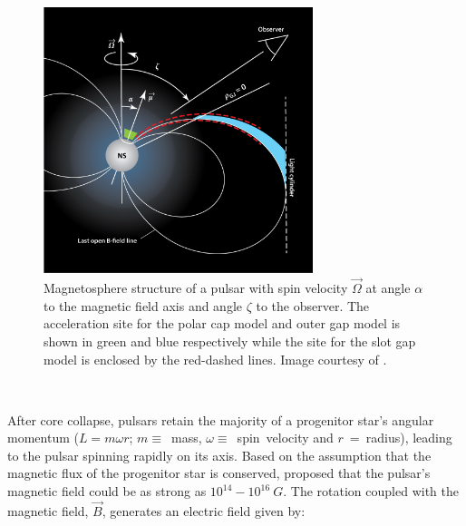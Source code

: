 \begin{figure}[ht]
	\centering
	\includegraphics[width=0.7\textwidth]{04_Introduction/Images/pulsar_wind_nebula/pulsar.jpeg}
	\caption{Magnetosphere structure of a pulsar with spin velocity $\vec{\Omega}$ at angle $\alpha$ to the magnetic field axis and angle $\zeta$ to the observer. The acceleration site for the polar cap model and outer gap model is shown in green and blue respectively while the site for the slot gap model is enclosed by the red-dashed lines. Image courtesy of \cite{2014ARA&A..52..211C}.}
	\label{fig:chapter1_magnetosphere_structure}
\end{figure}
\par~\par
After core collapse, pulsars retain the majority of a progenitor star's angular momentum ($L=m\omega r$; \mbox{$m \equiv$ mass}, \mbox{$\omega\equiv$ spin velocity} and \mbox{$r$ = radius}), leading to the pulsar spinning rapidly on its axis. Based on the assumption that the magnetic flux of the progenitor star is conserved, \cite{1964ApJ...140.1309W} proposed that the pulsar's magnetic field could be as strong as $10^{14}-10^{16}~\si{G}$. The rotation coupled with the magnetic field, $\vec{B}$, generates an electric field given by:

